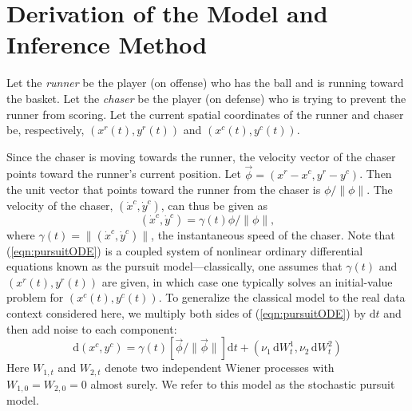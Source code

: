 \documentclass[graybox]{svmult}
\begin{document}
\section{Derivation of the Model and Inference Method}
\label{sec:2}
Let the \emph{runner} be the player (on offense) who has the ball and
is running toward the basket.  Let the \emph{chaser} be the player (on
defense) who is trying to prevent the runner from scoring. Let the
current spatial coordinates of the runner and chaser be, respectively,
$(x^{r}(t), y^{r}(t))$ and $(x^{c}(t), y^{c}(t))$.


Since the chaser is moving towards the runner, the velocity vector of the chaser
points toward the runner's current position.  Let $\vec{\phi} = (x^{r}
- x^{c}, y^{r} - y^{c})$. Then the unit vector that points toward the
runner from the chaser is $\phi / \| \phi \|$.  The velocity of the chaser, $(\dot{x}^c, \dot{y}^c)$, can thus be given as
\begin{equation}
\label{eqn:pursuitODE}
(\dot{x}^c, \dot{y}^c) = \gamma(t) \phi / \| \phi \|,
\end{equation}
where $\gamma(t) = \| (\dot{x}^c,\dot{y}^c) \|$, the instantaneous
speed of the chaser.  Note that (\ref{eqn:pursuitODE}) is a coupled
system of nonlinear ordinary differential equations known as the
pursuit model---classically, one assumes that
$\gamma(t)$ and $(x^{r}(t),y^{r}(t))$ are given, in which case one
typically solves an initial-value problem for $(x^{c}(t),y^{c}(t))$.
To generalize the classical model to the real data context considered
here, we multiply both sides of (\ref{eqn:pursuitODE}) by $\mathrm{d}t$ and
then add noise to each component:
\begin{equation}
\label{eqn:pursuitSDE}
\mathrm{d}(x^{c}, y^{c}) = \gamma(t) \left[ \vec{\phi} / \|
                           \vec{\phi} \|  \right]  \mathrm{d}t + (\nu_1 \,
                         \mathrm{d}W^1_t, \nu_2 \, \mathrm{d}W^2_t)
\end{equation}
Here $W_{1,t}$ and $W_{2,t}$ denote two independent Wiener processes
with $W_{1,0} = W_{2,0} = 0$ almost surely.  We refer to this model as
the stochastic pursuit model.
\end{document}
